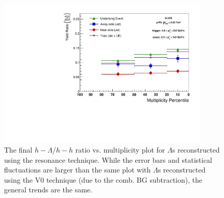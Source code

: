 \documentclass[ALICE,manyauthors]{ALICE_analysis_notes}
\begin{document}
\begin{figure}[ht]
\centering
\includegraphics[width=4in]{figures/ratio_plot_resonance.pdf}
\caption{The final $h-\Lambda$/$h-h$ ratio vs. multiplicity plot for $\Lambda$s reconstructed using the resonance technique. While the error bars and statistical fluctuations are larger than the same plot with $\Lambda$s reconstructed using the V0 technique (due to the comb. BG subtraction), the general trends are the same.}
\label{final_ratio_resonance}
\end{figure}
\end{document}
